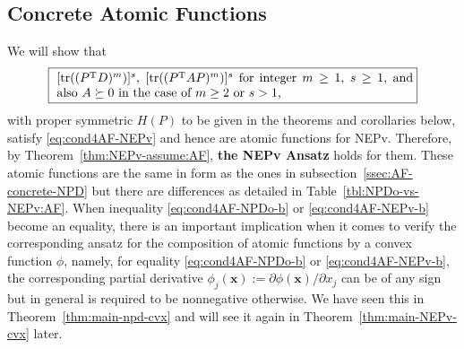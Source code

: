 \documentclass[11pt]{article}
\def\bx{\pmb{x}}
\DeclareMathOperator{\tr}{tr}
\DeclareMathOperator{\T}{T}
\theoremstyle{definition}
\numberwithin{equation}{section}
\begin{document}
\subsection{Concrete Atomic Functions}\label{ssec:AF-concrete-NEPv}
We will show  that
\begin{equation}\label{eq:concrete-AF:NEPv}
\framebox{
\parbox{10cm}{
$[\tr((P^{\T}D)^m)]^s$,
        $[\tr((P^{\T}AP)^m)]^s$
for integer $m\ge 1$, $s\ge 1$, and also $A\succeq 0$ in the case of $m\ge 2$ or $s>1$,
}}
\end{equation}
with proper symmetric $H(P)$ to be given in the theorems and corollaries below,
satisfy \eqref{eq:cond4AF-NEPv}
and hence are atomic functions for NEPv.
Therefore, by Theorem~\ref{thm:NEPv-assume:AF}, {\bf the NEPv Ansatz} holds for them.
These atomic functions are the same in form as the ones in subsection~\ref{ssec:AF-concrete-NPD}
but there are differences as detailed in Table~\ref{tbl:NPDo-vs-NEPv:AF}.
When inequality \eqref{eq:cond4AF-NPDo-b} or \eqref{eq:cond4AF-NEPv-b}
become an equality, there is an important implication when it comes to
verify the corresponding ansatz for
 the composition
of atomic functions by a convex function $\phi$, namely, for equality \eqref{eq:cond4AF-NPDo-b} or \eqref{eq:cond4AF-NEPv-b},
the corresponding partial derivative $\phi_j(\bx):=\partial\phi(\bx)/\partial x_j$
can be of any sign but in general is required to be nonnegative otherwise. We have seen this
in Theorem~\ref{thm:main-npd-cvx} and will see it again in Theorem~\ref{thm:main-NEPv-cvx} later.

\end{document}
